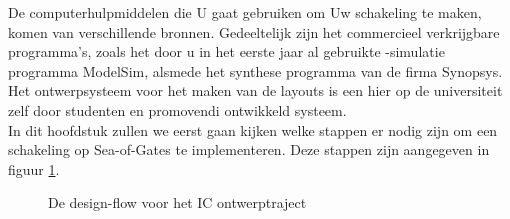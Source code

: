 De computerhulpmiddelen die U gaat gebruiken om Uw schakeling te maken,
komen van verschillende bronnen. Gedeeltelijk zijn het commercieel
verkrijgbare programma's, zoals het door u in het eerste jaar al gebruikte
-simulatie programma ModelSim,
alsmede het synthese programma van de firma Synopsys.
Het ontwerpsysteem  voor het maken van de
layouts is een hier op de universiteit zelf door studenten en promovendi
ontwikkeld systeem.\\
In dit hoofdstuk zullen we eerst gaan kijken welke stappen er nodig zijn om
een schakeling op Sea-of-Gates te implementeren.
Deze stappen zijn aangegeven in figuur \ref{desflow-window}.

\begin{figure}[htb]
  \centerline{}
  \caption{De design-flow voor het IC ontwerptraject}
  \label{desflow-window}
\end{figure}

